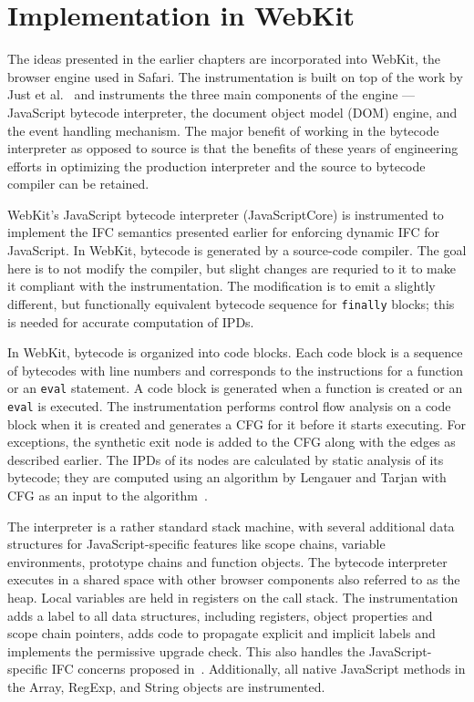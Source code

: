 \chapter{Implementation in WebKit}
\label{ch:impl}

The ideas presented in the earlier chapters are incorporated into
WebKit, the browser engine used in Safari. The instrumentation is
built on top of the work by Just et al.~\cite{just11PLASTIC} and
instruments the three main components of the engine --- JavaScript 
bytecode interpreter, the document object model (DOM) engine, and the
event handling mechanism. The major benefit of working in the bytecode
interpreter as opposed to source is that the benefits of these years
of engineering efforts in optimizing the production interpreter and
the source to bytecode compiler can be retained.

WebKit’s JavaScript bytecode interpreter (JavaScriptCore) is
instrumented to implement the IFC semantics presented earlier for
enforcing dynamic IFC for JavaScript. In WebKit, bytecode is generated
by a source-code compiler. The goal here is to not modify the
compiler, but slight changes are requried to it to make it compliant
with the instrumentation. The modification is to emit a slightly
different, but functionally equivalent bytecode sequence for
\texttt{finally} blocks; this is needed for accurate 
computation of IPDs. 

In WebKit, bytecode is organized into code blocks. Each code block is
a sequence of bytecodes with line numbers and corresponds to the
instructions for a function or an \texttt{eval} statement. A code block is
generated when a function is created or an \texttt{eval} is executed.  
The instrumentation performs control flow analysis on a code block
when it is created and generates a CFG for it before it starts
executing. For exceptions, the synthetic exit node is added to the CFG
along with the edges as described earlier. The IPDs of its nodes are
calculated by static analysis of its bytecode; they are computed using
an algorithm by Lengauer and Tarjan with CFG as an input to the
algorithm~\cite{Lengauer}. 

The interpreter is a rather standard stack machine, with several
additional data structures for JavaScript-specific features like scope
chains, variable environments, prototype chains and function 
objects. The bytecode interpreter executes in a shared space with
other browser components also referred to as the heap. Local variables
are held in registers on the call stack. The instrumentation adds a
label to all data structures, including registers, object properties
and scope chain pointers, adds code to propagate explicit and implicit
labels and implements the permissive upgrade check. This also handles
the JavaScript-specific IFC concerns proposed
in~\cite{csf12,post14}. Additionally, all native JavaScript methods in
the Array, RegExp, and String objects are instrumented. 

